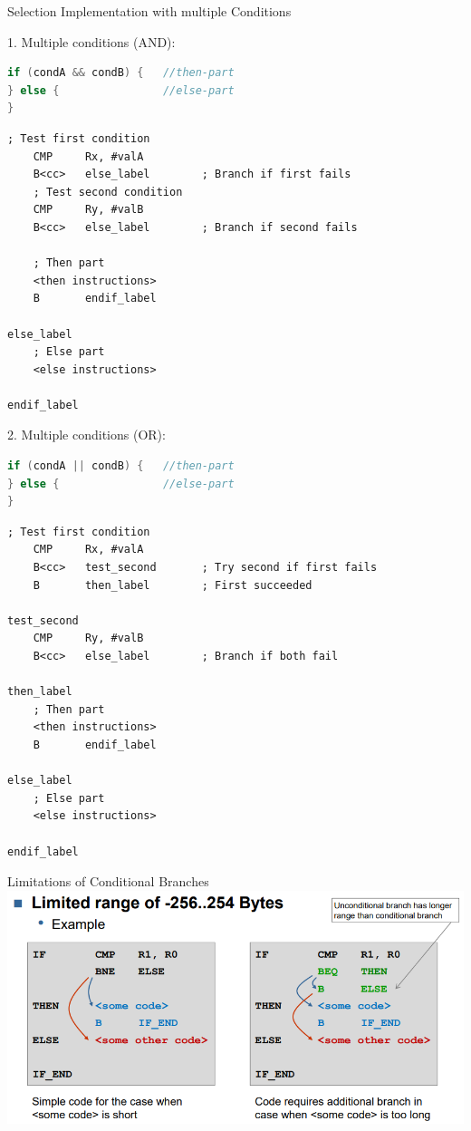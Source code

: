 \begin{KR}{Selection Implementation} with multiple Conditions

1. Multiple conditions (AND):
\begin{lstlisting}[language=C, style=basesmol]
if (condA && condB) {   //then-part
} else {                //else-part
}
\end{lstlisting}
\vspace{-4mm}
\begin{lstlisting}[language=armasm, style=basesmol]
    ; Test first condition
    CMP     Rx, #valA
    B<cc>   else_label        ; Branch if first fails
    ; Test second condition
    CMP     Ry, #valB
    B<cc>   else_label        ; Branch if second fails

    ; Then part
    <then instructions>
    B       endif_label
    
else_label
    ; Else part
    <else instructions>
    
endif_label
\end{lstlisting}

2. Multiple conditions (OR):
\begin{lstlisting}[language=C, style=basesmol]
if (condA || condB) {   //then-part
} else {                //else-part
}
\end{lstlisting}
\vspace{-4mm}
\begin{lstlisting}[language=armasm, style=basesmol]
    ; Test first condition
    CMP     Rx, #valA
    B<cc>   test_second       ; Try second if first fails
    B       then_label        ; First succeeded
    
test_second
    CMP     Ry, #valB
    B<cc>   else_label        ; Branch if both fail
    
then_label
    ; Then part
    <then instructions>
    B       endif_label
    
else_label
    ; Else part
    <else instructions>
    
endif_label
\end{lstlisting}
\end{KR}

\begin{theorem}{Limitations of Conditional Branches}\\
    \includegraphics[width=\linewidth]{images/limitsofconditionalbranches.png}
\end{theorem}

